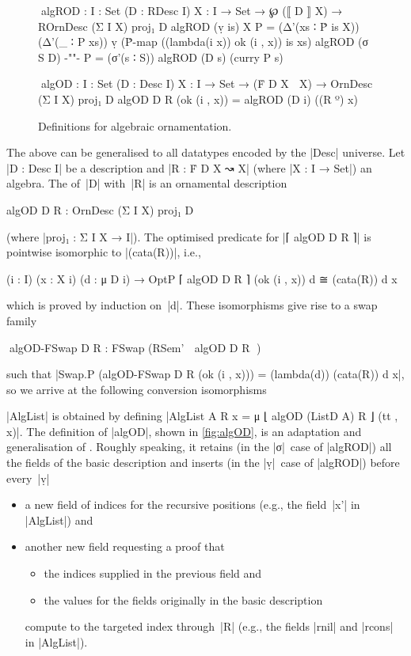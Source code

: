 \begin{figure}
\codefigure
\begin{code}
^^^algROD :  {I : Set} (D : RDesc I) {X : I → Set} →
             ℘ (⟦ D ⟧ X) → ROrnDesc (Σ I X) proj₁ D
algROD (ṿ is)   {X}     P =  (Δ'(xs ∶ Ṗ is X)) (Δ'(_ ∶ P xs))
                               ṿ (Ṗ-map ((lambda({i} x)) ok (i , x)) is xs)
algROD (σ S D)  {-""-}  P =  (σ'(s ∶ S)) algROD (D s) (curry P s)

^^^algOD :  {I : Set} (D : Desc I) {X : I → Set} →
            (Ḟ D X ↝ X) → OrnDesc (Σ I X) proj₁ D
algOD D R (ok (i , x)) = algROD (D i) ((R º) x)
\end{code}
\caption{Definitions for algebraic ornamentation.}
\label{fig:algOD}
\end{figure}

The above can be generalised to all datatypes encoded by the |Desc| universe.
Let |D : Desc I| be a description and |R : Ḟ D X ↝ X| (where |X : I → Set|) an algebra.
The  of~|D| with~|R| is an ornamental description
\begin{code}
algOD D R : OrnDesc (Σ I X) proj₁ D
\end{code}
(where |proj₁ : Σ I X → I|).
The optimised predicate for |⌈ algOD D R ⌉| is pointwise isomorphic to |(cata(R))|, i.e.,
\begin{code}
(i : I) (x : X i) (d : μ D i) → OptP ⌈ algOD D R ⌉ (ok (i , x)) d ≅ (cata(R)) d x
\end{code}
which is proved by induction on~|d|.
These isomorphisms give rise to a swap family
\begin{code}
^^^algOD-FSwap D R : FSwap (RSem' ⌈ algOD D R ⌉)
\end{code}
such that |Swap.P (algOD-FSwap D R (ok (i , x))) = (lambda(d)) (cata(R)) d x|, so we arrive at the following conversion isomorphisms
|AlgList| is obtained by defining |AlgList A R x = μ ⌊ algOD (ListD A) R ⌋ (tt , x)|.
The definition of |algOD|, shown in \autoref{fig:algOD}, is an adaptation and generalisation of .
Roughly speaking, it retains (in the |σ|~case of |algROD|) all the fields of the basic description and inserts (in the |ṿ|~case of |algROD|) before every~|ṿ|
\begin{itemize}
\item a new field of indices for the recursive positions (e.g., the field~|x'| in |AlgList|) and
\item another new field requesting a proof that
\begin{itemize}
\item the indices supplied in the previous field and 
\item the values for the fields originally in the basic description
\end{itemize}
compute to the targeted index through~|R| (e.g., the fields |rnil| and |rcons| in |AlgList|).
\end{itemize}

